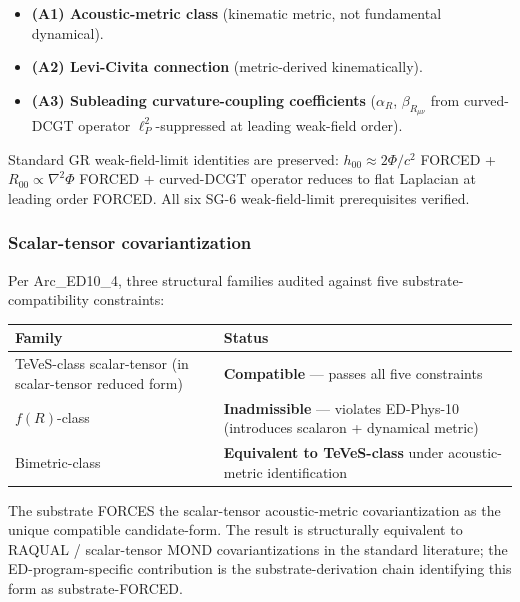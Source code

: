 \documentclass[
  11pt,a4paper]{article}
\newcounter{none} %
\providecommand{\tightlist}{%
  \setlength{\itemsep}{0pt}\setlength{\parskip}{0pt}}
\begin{document}
\begin{itemize}
\tightlist
\item
  \textbf{(A1) Acoustic-metric class} (kinematic metric, not fundamental
  dynamical).
\item
  \textbf{(A2) Levi-Civita connection} (metric-derived kinematically).
\item
  \textbf{(A3) Subleading curvature-coupling coefficients}
  (\(\alpha_R\), \(\beta_{R_{\mu\nu}}\) from curved-DCGT operator
  \(\ell_P^2\)-suppressed at leading weak-field order).
\end{itemize}

Standard GR weak-field-limit identities are preserved:
\(h_{00} \approx 2\Phi/c^2\) FORCED + \(R_{00} \propto \nabla^2\Phi\)
FORCED + curved-DCGT operator reduces to flat Laplacian at leading order
FORCED. All six SG-6 weak-field-limit prerequisites verified.

\subsubsection{Scalar-tensor
covariantization}\label{scalar-tensor-covariantization}

Per Arc\_ED10\_4, three structural families audited against five
substrate-compatibility constraints:

{\def\LTcaptype{none} %
\begin{longtable}[]{@{}
  >{\raggedright\arraybackslash}p{}
  >{\raggedright\arraybackslash}p{}@{}}
\toprule\noalign{}
\begin{minipage}[b]{\linewidth}\raggedright
Family
\end{minipage} & \begin{minipage}[b]{\linewidth}\raggedright
Status
\end{minipage} \\
\midrule\noalign{}
\endhead
\bottomrule\noalign{}
\endlastfoot
TeVeS-class scalar-tensor (in scalar-tensor reduced form) &
\textbf{Compatible} --- passes all five constraints \\
\(f(R)\)-class & \textbf{Inadmissible} --- violates ED-Phys-10
(introduces scalaron + dynamical metric) \\
Bimetric-class & \textbf{Equivalent to TeVeS-class} under
acoustic-metric identification \\
\end{longtable}
}

The substrate FORCES the scalar-tensor acoustic-metric covariantization
as the unique compatible candidate-form. The result is structurally
equivalent to RAQUAL / scalar-tensor MOND covariantizations in the
standard literature; the ED-program-specific contribution is the
substrate-derivation chain identifying this form as substrate-FORCED.
\end{document}
